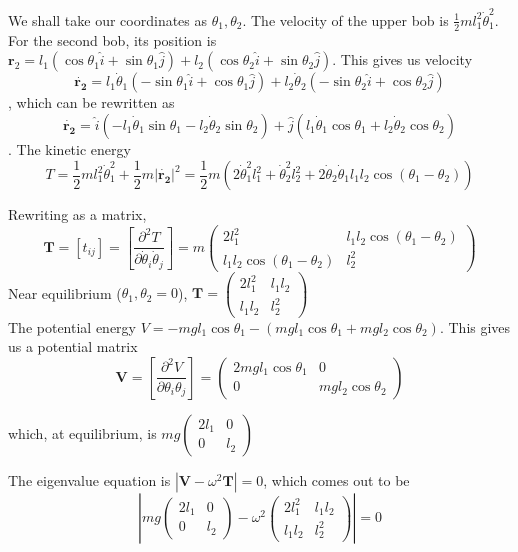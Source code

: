 \documentclass[12pt]{article}
\begin{document}
We shall take our coordinates as $\theta_1,\theta_2$. The velocity of the upper bob is $\frac12ml_1^2\dot\theta_1^2$. For the second bob, its position is $\mathbf r_2=l_1(\cos\theta_1\hat i +\sin\theta_1\hat j)+ l_2(\cos\theta_2\hat i +\sin\theta_2\hat j)$.  This gives us velocity $$\dot{\mathbf{r_2}}=l_1\dot\theta_1(-\sin\theta_1\hat i +\cos\theta_1\hat j)+ l_2\dot\theta_2(-\sin\theta_2\hat i +\cos\theta_2\hat j)$$, which can be rewritten as $$\dot{\mathbf{r_2}}=\hat i(-l_1\dot\theta_1\sin\theta_1-l_2\dot\theta_2\sin\theta_2)+ \hat j(l_1\dot\theta_1\cos\theta_1+l_2\dot\theta_2\cos\theta_2)$$. The kinetic energy $$T=\frac12ml_1^2\dot\theta_1^2+\frac12m|\dot{\mathbf{r_2}}|^2=\frac12m\left(2\dot{\theta }_1^2 l_1^2+\dot{\theta }_2^2
   l_2^2+2 \dot{\theta }_2 \dot{\theta }_1 l_1
   l_2 \cos \left(\theta _1-\theta _2\right)\right)$$
   
Rewriting as a matrix,  $$\mathbf T=[t_{ij}]=\left[\frac{\partial^2 T}{\partial \dot \theta_i \dot \theta_j}\right]=m\begin{pmatrix}
2l_1^2 & l_1l_2\cos(\theta_1-\theta_2)\\
l_1l_2\cos(\theta_1-\theta_2) & l_2^2
\end{pmatrix}$$
Near equilibrium ($\theta_1,\theta_2=0$), $\mathbf T=\begin{pmatrix}
2l_1^2 & l_1l_2\\
l_1l_2 & l_2^2
\end{pmatrix}$\\

The potential energy $V=-mgl_1\cos\theta_1-(mgl_1\cos\theta_1+mgl_2\cos\theta_2)$. This gives us a potential matrix $$\mathbf V =\left[\frac{\partial^2 V}{\partial \theta_i \theta_j}\right]=\begin{pmatrix}
2mgl_1\cos\theta_1&0\\
0& mgl_2\cos\theta_2
\end{pmatrix}$$

which, at equilibrium, is $mg\begin{pmatrix}
2l_1&0\\0&l_2
\end{pmatrix}$

The eigenvalue equation is $|\mathbf V-\omega^2 \mathbf T|=0$, which comes out to be $$\left|mg\begin{pmatrix}
2l_1&0\\0&l_2
\end{pmatrix}-\omega^2\begin{pmatrix}
2l_1^2 & l_1l_2\\
l_1l_2 & l_2^2
\end{pmatrix}\right|=0$$
\end{document}
